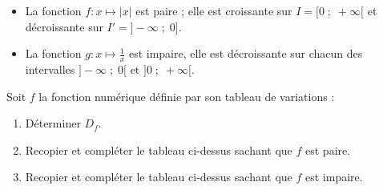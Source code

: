 \documentclass[10pt, a4paper]{article}
\begin{document}
\begin{Exemple}[][10 min]
\begin{itemize}[leftmargin=*,itemsep=1pt]
    \item La fonction $f : x \mapsto |x|$ est paire ; elle est croissante sur $I = \big[0 \;;\; +\infty\big[$ et décroissante sur $I' = \big]-\infty \;;\; 0\big]$.
    \item La fonction $g : x \mapsto \frac{1}{x}$ est impaire, elle est décroissante sur chacun des intervalles $\big]-\infty \;;\; 0\big[$ et $\big]0 \;;\; +\infty\big[$.
\end{itemize}
\end{Exemple}

\begin{Application}[][30 min]
Soit $f$ la fonction numérique définie par son tableau de variations :

\vspace{0.3cm}
\begin{center}
\end{center}
\vspace{0.2cm}

\begin{enumerate}[leftmargin=*,itemsep=1pt]
    \item Déterminer $D_f$.
    \item Recopier et compléter le tableau ci-dessus sachant que $f$ est paire.
    \item Recopier et compléter le tableau ci-dessus sachant que $f$ est impaire.
\end{enumerate}
\end{Application}
\end{document}
